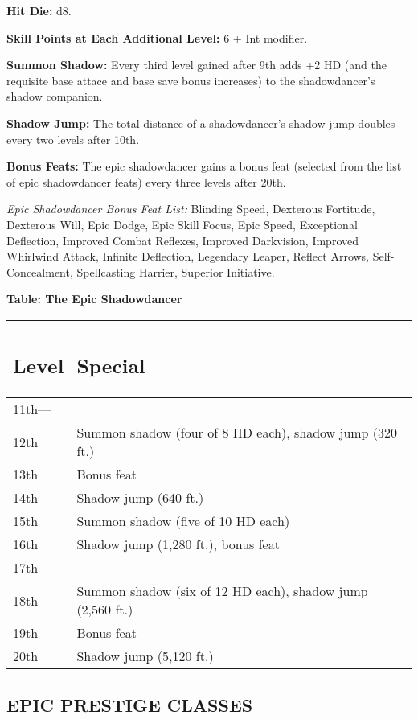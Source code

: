 \documentclass{article}
\begin{document}
\textbf{Hit Die:} d8. 

\textbf{Skill Points at Each Additional Level:} 6 + Int modifier. 

\textbf{Summon Shadow:} Every third level gained after 9th adds +2 HD (and the 
requisite base attace and base save bonus increases) to the shadowdancer's shadow 
companion. 

\textbf{Shadow Jump:} The total distance of a shadowdancer's shadow jump doubles 
every two levels after 10th. 

\textbf{Bonus Feats:} The epic shadowdancer gains a bonus feat (selected from the 
list of epic shadowdancer feats) every three levels after 20th. 

\textit{Epic Shadowdancer Bonus Feat List: }Blinding Speed, Dexterous Fortitude, 
Dexterous Will, Epic Dodge, Epic Skill Focus, Epic Speed, Exceptional Deflection, 
Improved Combat Reflexes, Improved Darkvision, Improved Whirlwind Attack, Infinite 
Deflection, Legendary Leaper, Reflect Arrows, Self-Concealment, Spellcasting Harrier, 
Superior Initiative. 

\textbf{Table: The Epic Shadowdancer }

\begin{tabular}{|>{\raggedright}p{27pt}|>{\raggedright}p{258pt}|}
\hline
\subsection*{L\textbf{evel}} & \subsection*{S\textbf{pecial }}\tabularnewline
\hline
11th--- &  \tabularnewline
\hline
12th & Summon shadow (four of 8 HD each), shadow jump (320 ft.) \tabularnewline
\hline
13th & Bonus feat \tabularnewline
\hline
14th & Shadow jump (640 ft.) \tabularnewline
\hline
15th & Summon shadow (five of 10 HD each) \tabularnewline
\hline
16th & Shadow jump (1,280 ft.), bonus feat \tabularnewline
\hline
17th--- &  \tabularnewline
\hline
18th & Summon shadow (six of 12 HD each), shadow jump (2,560 ft.) \tabularnewline
\hline
19th & Bonus feat \tabularnewline
\hline
20th & Shadow jump (5,120 ft.)\tabularnewline
\hline
\end{tabular}

\vspace{24pt}
\subsection*{{\LARGE{}EPIC PRESTIGE CLASSES }}
\end{document}

